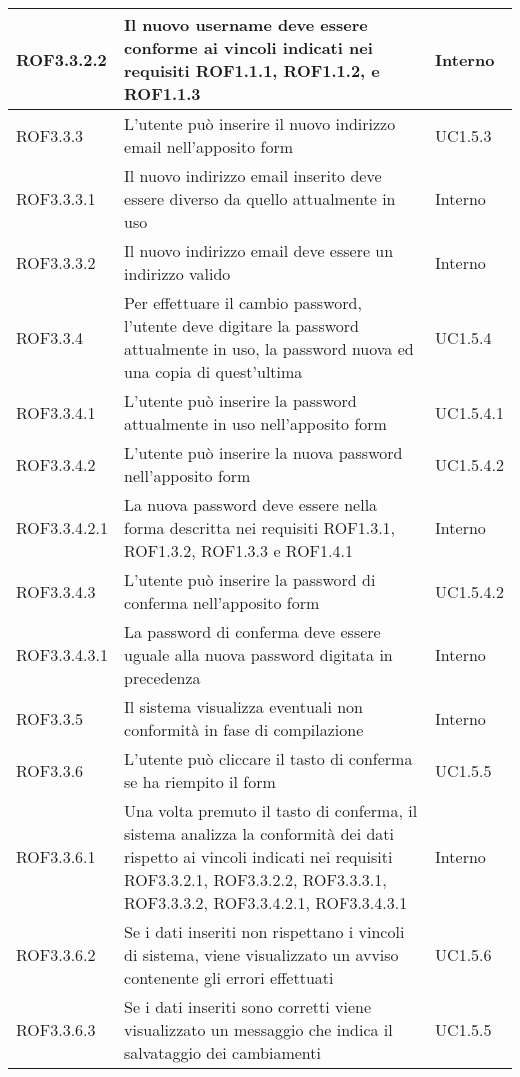 \begin{center}
\begin{longtable}{| p{2.5cm} | p{8cm} | p{2cm} |}
		\hline
		ROF3.3.2.2  &  Il nuovo username deve essere conforme ai vincoli indicati nei requisiti ROF1.1.1, ROF1.1.2,  e ROF1.1.3  &  Interno \\
		\hline
		ROF3.3.3  &  L'utente può inserire il nuovo indirizzo email nell'apposito form  &  UC1.5.3 \\
		\hline
		ROF3.3.3.1  &  Il nuovo indirizzo email inserito deve essere diverso da quello attualmente in uso  &  Interno \\
		\hline
		ROF3.3.3.2  &  Il nuovo indirizzo email deve essere un indirizzo valido  &  Interno \\
		\hline
		ROF3.3.4  &  Per effettuare il cambio password, l'utente deve digitare la password attualmente in uso, la password nuova ed una copia di quest'ultima  &  UC1.5.4 \\
		\hline
		ROF3.3.4.1  &  L'utente può inserire la password attualmente in uso nell'apposito form  &  UC1.5.4.1 \\
		\hline
		ROF3.3.4.2  &  L'utente può inserire la nuova password nell'apposito form  &  UC1.5.4.2 \\
		\hline
		ROF3.3.4.2.1  &  La nuova password deve essere nella forma descritta nei requisiti ROF1.3.1, ROF1.3.2, ROF1.3.3 e ROF1.4.1  &  Interno \\
		\hline
		ROF3.3.4.3  &  L'utente può inserire la password di conferma nell'apposito form  &  UC1.5.4.2 \\
		\hline
		ROF3.3.4.3.1  &  La password di conferma deve essere uguale alla nuova password digitata in precedenza  &  Interno \\
		\hline
		ROF3.3.5  &  Il sistema visualizza eventuali non conformità in fase di compilazione  &  Interno \\
		\hline
		ROF3.3.6  &  L'utente può cliccare il tasto di conferma se ha riempito il form  &  UC1.5.5 \\
		\hline
		ROF3.3.6.1  &  Una volta premuto il tasto di conferma, il sistema analizza la conformità dei dati rispetto ai vincoli indicati nei requisiti ROF3.3.2.1, ROF3.3.2.2, ROF3.3.3.1, ROF3.3.3.2, ROF3.3.4.2.1, ROF3.3.4.3.1  &  Interno \\
		\hline
		ROF3.3.6.2  &  Se i dati inseriti non rispettano i vincoli di sistema, viene visualizzato un avviso contenente gli errori effettuati  &  UC1.5.6 \\
		\hline
		ROF3.3.6.3  &  Se i dati inseriti sono corretti viene visualizzato un messaggio che indica il salvataggio dei cambiamenti  &  UC1.5.5 \\


\end{longtable}
\end{center}
